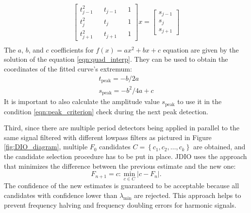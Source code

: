 \documentclass[a4paper]{article}
\begin{document}
\begin{equation}\label{eqn:quad_interp}
    \begin{array}{l}
        \begin{bmatrix}
            t_{j-1}^2 && t_{j-1} && 1 \\
            t_j^2 && t_j && 1 \\
            t_{j+1}^2 && t_{j+1} && 1
        \end{bmatrix}
        x
        = \begin{bmatrix}
            s_{j-1} \\ s_j \\ s_{j+1}
        \end{bmatrix} \\
    \end{array}
\end{equation}
The $a$, $b$, and $c$ coefficients for $f(x)=ax^2+bx+c$ equation are given by the solution of the equation \eqref{eqn:quad_interp}. They can be used to obtain the coordinates of the fitted curve's extremum:
\begin{equation}\label{eqn:peak_detection}
    \begin{array}{l}
        t_\text{peak} = -b / 2a \\
        s_\text{peak} = -b^2 / 4a + c
    \end{array}
\end{equation}
It is important to also calculate the amplitude value $s_\text{peak}$ to use it in the condition \eqref{eqn:peak_criterion} check during the next peak detection.

Third, since there are multiple period detectors being applied in parallel to the same signal filtered with different lowpass filters as pictured in Figure \ref{fig:DIO_diagram}, multiple $F_0$ candidates $C=\left\{c_1,c_2,\dots,c_k\right\}$ are obtained, and the candidate selection procedure has to be put in place. JDIO uses the approach that minimizes the difference between the previous estimate and the new one:
\begin{equation}\label{eqn:new_f0_selection}
    F_{n+1} = c : \min_{c \in C}{\left|c - F_n\right|}.
\end{equation}
The confidence of the new estimates is guaranteed to be acceptable because all candidates with confidence lower than $\lambda_\text{min}$ are rejected. This approach helps to prevent frequency halving and frequency doubling errors for harmonic signals.
\end{document}

